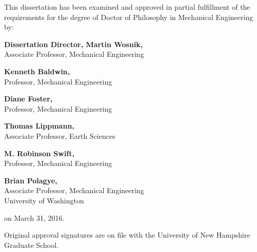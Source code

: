 \newpage
\vspace*{0.75 in}

\begin{singlespace}


\noindent \small{This dissertation has been examined and approved in partial fulfillment of the requirements for the degree of Doctor of Philosophy in Mechanical Engineering by:}
\vspace{0.5in}

\hfill                                       %
\parbox{4in}{                               %
    \textbf{Dissertation Director, Martin Wosnik,}\\ 
    \small{Associate Professor, Mechanical Engineering}
    \vspace{0.2in}
    
    \textbf{Kenneth Baldwin,}\\ 
    \small{Professor, Mechanical Engineering}
    \vspace{0.2in}
    
    \textbf{Diane Foster,}\\  
    \small{Professor, Mechanical Engineering}
    \vspace{0.2in}
    
    \textbf{Thomas Lippmann,}\\
    \small{Associate Professor, Earth Sciences}
    \vspace{0.2in}
    
    \textbf{M. Robinson Swift,}\\ 
    \small{Professor, Mechanical Engineering}
    \vspace{0.2in}
    
    \textbf{Brian Polagye,}\\ 
    \small{Associate Professor, Mechanical Engineering \\ University of Washington}
    \vspace{0.2in}
    
    on March 31, 2016.\\
}


\vspace{0.5 in}
\noindent \small{Original approval signatures are on file with the University of New Hampshire Graduate School.}


\end{singlespace}
\vspace*{\fill}

